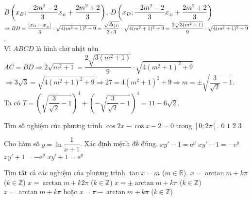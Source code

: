 \begin{ex}
{$B\left(x_{\tiny{B}};\dfrac{-2m^{2}-2}{3}x_{\tiny_{B}}+\dfrac{2m^{2}+2}{3}\right)$, $D\left(x_{\tiny{D}};\dfrac{-2m^{2}-2}{3}x_{\tiny_{D}}+\dfrac{2m^{2}+2}{3}\right)$\\
$\Rightarrow BD=\dfrac{\left|x_{\tiny{B}}-x_{\tiny_{D}}\right|}{3}\cdot\sqrt{4(m^{2}+1)^{2}+9}=\dfrac{\sqrt{\Delta_{(1)}}}{3\cdot 3}\cdot \sqrt{4(m^{2}+1)^{2}+9}=\dfrac{2\sqrt{3(m^{2}+1)}}{9}\cdot \sqrt{4(m^{2}+1)^{2}+9}$.\\
Vì $ABCD$ là hình chữ nhật nên $AC=BD\Rightarrow 2\sqrt{m^{2}+1}= \dfrac{2\sqrt{3(m^{2}+1)}}{9}\cdot\sqrt{4(m^{2}+1)^{2}+9}$\\
$\Rightarrow 3\sqrt{3}=\sqrt{4(m^{2}+1)^{2}+9}\Rightarrow 27=4(m^{2}+1)^{2}+9\Rightarrow m=\pm\sqrt{\dfrac{3}{\sqrt{2}}-1}$.\\
Ta có $T=\left(\sqrt{\dfrac{3}{\sqrt{2}}-1}\right)^{4}+\left(-\sqrt{\dfrac{3}{\sqrt{2}}-1}\right)^{4}=11-6\sqrt{2}$.
}
\end{ex}
\begin{ex}%
Tìm số nghiệm của phương trình $\cos 2x-\cos x-2=0$ trong $[0;2\pi]$.
\choice
{$0$}
{\True $1$}
{$2$}
{$3$}
\end{ex}
\begin{ex}%
Cho hàm số $y=\ln\dfrac{1}{x+1}$. Xác định mệnh đề đúng.
\choice
{$xy'-1=\mathrm{e}^{y}$}
{$xy'-1=-\mathrm{e}^{y}$}
{$xy'+1=-\mathrm{e}^{y}$}
{\True $xy'+1=\mathrm{e}^{y}$}
\end{ex}
\begin{ex}%
Tìm tất cả các nghiệm của phương trình $\tan x=m$ ($m\in \mathbb R$).
\choice
{\True $x=\arctan m+k\pi$ ($k\in\mathbb Z$)}
{$x=\arctan m+k2\pi$ ($k\in\mathbb Z$)}
{$x=\pm\arctan m+k\pi$ ($k\in\mathbb Z$)}
{$x=\arctan m+k\pi$ hoặc $x=\pi -\arctan m+k\pi$ ($k\in\mathbb Z$)}
\end{ex}
